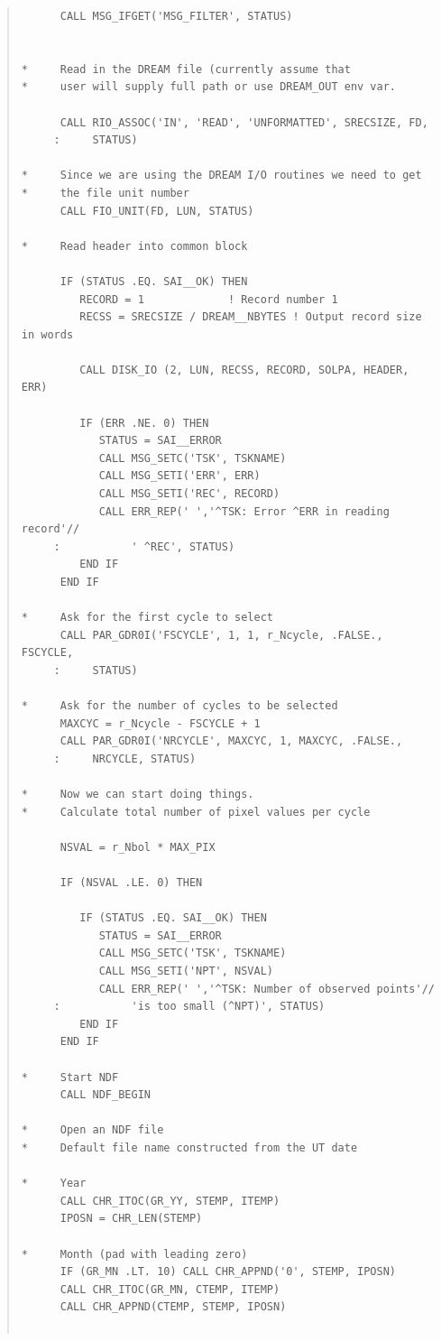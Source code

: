 \documentclass[twoside,11pt]{article}
\newenvironment{myquote}{\begin{quote}\begin{small}}{\end{small}\end{quote}}
\renewcommand{\_}{\texttt{\symbol{95}}}
\begin{document}
\begin{myquote}
\begin{verbatim}
      CALL MSG_IFGET('MSG_FILTER', STATUS)


*     Read in the DREAM file (currently assume that 
*     user will supply full path or use DREAM_OUT env var.

      CALL RIO_ASSOC('IN', 'READ', 'UNFORMATTED', SRECSIZE, FD,
     :     STATUS)

*     Since we are using the DREAM I/O routines we need to get
*     the file unit number
      CALL FIO_UNIT(FD, LUN, STATUS)

*     Read header into common block

      IF (STATUS .EQ. SAI__OK) THEN
         RECORD = 1             ! Record number 1
         RECSS = SRECSIZE / DREAM__NBYTES ! Output record size in words

         CALL DISK_IO (2, LUN, RECSS, RECORD, SOLPA, HEADER, ERR)

         IF (ERR .NE. 0) THEN
            STATUS = SAI__ERROR
            CALL MSG_SETC('TSK', TSKNAME)
            CALL MSG_SETI('ERR', ERR)
            CALL MSG_SETI('REC', RECORD)
            CALL ERR_REP(' ','^TSK: Error ^ERR in reading record'//
     :           ' ^REC', STATUS)
         END IF
      END IF

*     Ask for the first cycle to select
      CALL PAR_GDR0I('FSCYCLE', 1, 1, r_Ncycle, .FALSE., FSCYCLE,
     :     STATUS)

*     Ask for the number of cycles to be selected
      MAXCYC = r_Ncycle - FSCYCLE + 1
      CALL PAR_GDR0I('NRCYCLE', MAXCYC, 1, MAXCYC, .FALSE., 
     :     NRCYCLE, STATUS)

*     Now we can start doing things.
*     Calculate total number of pixel values per cycle

      NSVAL = r_Nbol * MAX_PIX

      IF (NSVAL .LE. 0) THEN

         IF (STATUS .EQ. SAI__OK) THEN
            STATUS = SAI__ERROR
            CALL MSG_SETC('TSK', TSKNAME)
            CALL MSG_SETI('NPT', NSVAL)
            CALL ERR_REP(' ','^TSK: Number of observed points'//
     :           'is too small (^NPT)', STATUS)
         END IF
      END IF

*     Start NDF
      CALL NDF_BEGIN

*     Open an NDF file
*     Default file name constructed from the UT date

*     Year
      CALL CHR_ITOC(GR_YY, STEMP, ITEMP)
      IPOSN = CHR_LEN(STEMP)

*     Month (pad with leading zero)
      IF (GR_MN .LT. 10) CALL CHR_APPND('0', STEMP, IPOSN)
      CALL CHR_ITOC(GR_MN, CTEMP, ITEMP)
      CALL CHR_APPND(CTEMP, STEMP, IPOSN)


\end{verbatim}
\end{myquote}
\end{document}
